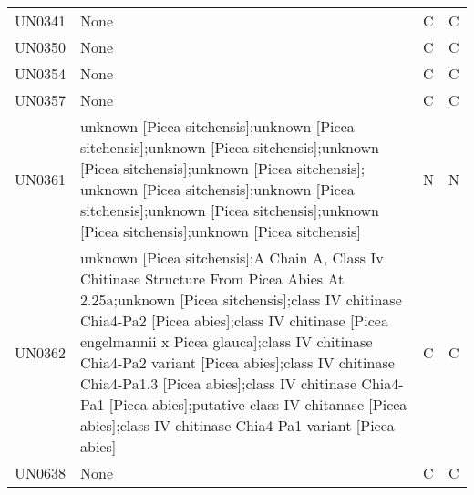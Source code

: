 \begin{longtable}{llll}
UN0341 &  None &  C &  C \\
UN0350 &  None &  C &  C \\
UN0354 &  None &  C &  C \\
UN0357 &  None &  C &  C \\
UN0361 &  unknown [Picea sitchensis];unknown [Picea sitchensis];unknown [Picea sitchensis];unknown [Picea sitchensis];unknown [Picea sitchensis]; unknown [Picea sitchensis];unknown [Picea sitchensis];unknown [Picea sitchensis];unknown [Picea sitchensis];unknown [Picea sitchensis] &  N &  N \\
UN0362 &  unknown [Picea sitchensis];A Chain A, Class Iv Chitinase Structure From Picea Abies At 2.25a;unknown [Picea sitchensis];class IV chitinase Chia4-Pa2 [Picea abies];class IV chitinase [Picea engelmannii x Picea glauca];class IV chitinase Chia4-Pa2 variant [Picea abies];class IV chitinase Chia4-Pa1.3 [Picea abies];class IV chitinase Chia4-Pa1 [Picea abies];putative class IV chitanase [Picea abies];class IV chitinase Chia4-Pa1 variant [Picea abies] &  C &  C \\
UN0638 &  None &  C &  C \\
\end{longtable}
